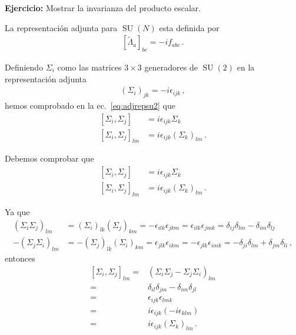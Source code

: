 \textbf{Ejercicio:} Mostrar la invarianza del producto escalar.


\begin{frame}
La representación adjunta para $\operatorname{SU}(N)$ esta definida por
\begin{align}
  \left[ \widetilde{\Lambda}_a \right]_{bc}=-i f_{abc}\,.
\end{align}
\end{frame}

Definiendo $\Sigma_i$ como las matrices $3\times3$ generadores de $\operatorname{SU}(2)$ en la representación adjunta
\begin{align}
  (\Sigma_i)_{jk}=-i\epsilon_{ijk}\,,
\end{align}
hemos comprobado en la ec.~\eqref{eq:adjrepsu2} que
\begin{align}
  \left[{\Sigma_i},{\Sigma_j}\right]&=i\epsilon_{ijk}{\Sigma_k}\nonumber\\
  \left[{\Sigma_i},{\Sigma_j}\right]_{lm}&=i\epsilon_{ijk}(\Sigma_k)_{lm}\,.
\end{align}

Debemos comprobar que
\begin{align}
  \left[{\Sigma_i},{\Sigma_j}\right]&=i\epsilon_{ijk}{\Sigma_k}\nonumber\\
  \left[{\Sigma_i},{\Sigma_j}\right]_{lm}&=i\epsilon_{ijk}(\Sigma_k)_{lm}\,.
\end{align}

Ya que
\begin{align}
  \label{eq:167}
  (\Sigma_i\Sigma_j)_{lm}&=(\Sigma_i)_{lk}(\Sigma_j)_{km}=-\epsilon_{ilk}\epsilon_{jkm}=\epsilon_{ilk}\epsilon_{jmk}=\delta_{ij}\delta_{lm}-\delta_{im}\delta_{lj}\nonumber\\
  -(\Sigma_j\Sigma_i)_{lm}&=-(\Sigma_j)_{lk}(\Sigma_i)_{km}=\epsilon_{jlk}\epsilon_{ikm}=-\epsilon_{jlk}\epsilon_{imk}=-\delta_{ji}\delta_{lm}+\delta_{jm}\delta_{li}\,,
\end{align}
entonces
\begin{align}
\label{eq:adjrepsu2}
[\Sigma_i,\Sigma_j]_{lm}=& (\Sigma_i\Sigma_j-\Sigma_j\Sigma_i)_{lm}\nonumber\\
=&\delta_{il}\delta_{jm}-\delta_{im}\delta_{jl}\nonumber\\
=&\epsilon_{ijk}\epsilon_{lmk}\nonumber\\
=&i\epsilon_{ijk}(-i\epsilon_{klm})\nonumber\\
=&i\epsilon_{ijk}(\Sigma_k)_{lm}\,.
\end{align}




